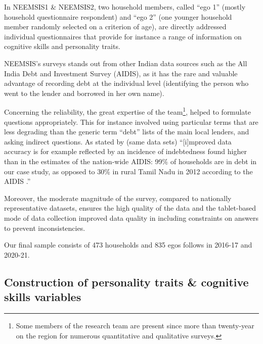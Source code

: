 \documentclass[a4paper, 11pt, onecolumn]{article}
\begin{document}
In NEEMSIS1 \& NEEMSIS2, two household members, called ``ego 1'' (mostly household questionnaire respondent) and ``ego 2'' (one younger household member randomly selected on a criterion of age), are directly addressed individual questionnaires that provide for instance a range of information on cognitive skills and personality traits.

NEEMSIS's surveys stands out from other Indian data sources such as the All India Debt and Investment Survey (AIDIS), as it has the rare and valuable advantage of recording debt at the individual level (identifying the person who went to the lender and borrowed in her own name).

Concerning the reliability, the great expertise of the team\footnote{Some members of the research team are present since more than twenty-year on the region for numerous quantitative and qualitative surveys.}, helped to formulate questions appropriately.
This for instance involved using particular terms that are less degrading than the generic term ``debt'' lists of the main local lenders, and asking indirect questions.
As stated by \cite{Reboul2021} (same data sets) ``[i]mproved data accuracy is for example reflected by an incidence of indebtedness found higher than in the estimates of the nation-wide AIDIS: 99\% of households are in debt in our case study, as opposed to 30\% in rural Tamil Nadu in 2012 according to the AIDIS \citep{NSSO2014}.'' 

Moreover, the moderate magnitude of the survey, compared to nationally representative datasets, ensures the high quality of the data and the tablet-based mode of data collection improved data quality in including constraints on answers to prevent inconsistencies. 

Our final sample consists of 473 households and 835 egos follows in 2016-17 and 2020-21.%







	\subsection{Construction of personality traits \& cognitive skills variables }
\end{document}
